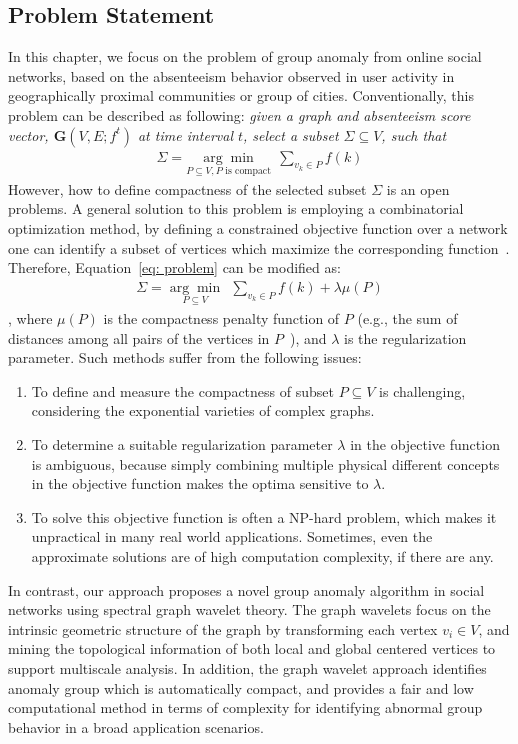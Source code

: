 \subsection{Problem Statement}
\label{sec:problemformulation}
In this chapter, we focus on the problem of group anomaly from online social networks, based on the absenteeism behavior observed in user activity in geographically proximal communities or group of cities.
Conventionally, this problem can be described as following: \emph{given a graph and \textit{absenteeism score} vector, $\mathbf{G}(V,E;f^t)$ at time interval $t$, select a subset $\Sigma \subseteq V$, such that
\begin{eqnarray}
 \label{eq: problem}
    \Sigma=\underset{P\subseteq V, P \mbox{ is compact}}{\arg\min}\ \ \sum_{v_k\in P} {f(k)}
\end{eqnarray} }
However, how to define compactness of the selected subset $\Sigma$ is an open problems.
A general solution to this problem is employing a combinatorial optimization method, by defining a constrained objective function over a network one can identify a subset of vertices which maximize the corresponding function~\cite{rozenshtein2014event}. Therefore, Equation~\ref{eq: problem} can be modified as:
\begin{eqnarray}
 \label{eq: problem_conventional}
    \Sigma=\underset{P\subseteq V}{\arg\min}\ \ \sum_{v_k\in P} {f(k)}+\lambda \mu(P)
\end{eqnarray}
, where $\mu(P)$ is the compactness penalty function of $P$ (e.g., the sum of distances among
all pairs of the vertices in $P$~\cite{rozenshtein2014event}), and $\lambda$ is the regularization parameter.
Such methods suffer from the following issues:
\begin{enumerate}
\item To define and measure the compactness of subset $P\subseteq V$ is challenging, considering the exponential varieties of complex graphs.
\item To determine a suitable regularization parameter $\lambda$ in the objective function is ambiguous, because simply combining multiple physical different concepts in the objective function makes the optima sensitive to $\lambda$.
\item To solve this objective function is often a NP-hard problem, which makes it unpractical in many real world applications. Sometimes, even the approximate solutions are of high computation complexity, if there are any.
\end{enumerate}
In contrast, our approach proposes a novel group anomaly algorithm in social networks using spectral graph wavelet theory.
The graph wavelets focus on the intrinsic geometric structure of the graph by transforming each vertex $v_i\in V$, and mining the topological information of both local and global centered vertices to support multiscale analysis.
In addition, the graph wavelet approach identifies anomaly group which is automatically compact, and provides a fair and low computational method in terms of complexity for identifying abnormal group behavior in a broad application scenarios.



